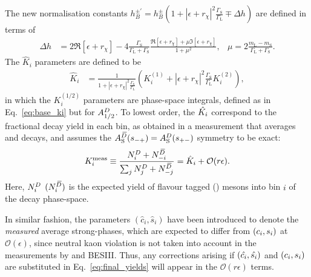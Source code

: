 The new normalisation constants $h_B^{\pm'}=h_B^{\pm}(1+|\epsilon+r_\chi|^2\frac{\Gamma_\text{S}}{\Gamma_\text{L}}\mp\Delta h)$ are defined in terms of
\begin{align}
        \Delta h &= 2\Re[\epsilon+r_\chi] 
    -4\frac{\Gamma_\text{S}}{\Gamma_\text{L}+\Gamma_\text{S}}\frac{\Re[\epsilon+r_\chi] + \mu \Im[\epsilon+r_\chi] }
    {1+\mu^2}, &
    \mu = 2 \frac{m_\text{L}-m_\text{S}}{\Gamma_\text{L}+\Gamma_\text{S}}.
\end{align}
The $\hat K_i$ parameters are defined to be
\begin{align}\label{eq:hat_Ki}
\hat K_i &= \frac{1}{1+|\epsilon+r_\chi|^2\frac{\Gamma_\text{S}}{\Gamma_\text{L}}}\left(K_i^{(1)}+|\epsilon+r_\chi|^2\frac{\Gamma_\text{S}}{\Gamma_\text{L}}K_i^{(2)}\right),
\end{align}
in which the $K^{(1/2)}_i$ parameters are phase-space integrals, defined as in Eq.~\eqref{eq:base_ki} but for $A^{D}_{1/2}$. To lowest order, the $\hat {K_i}$ correspond to the fractional \Dz decay yield in each bin, as obtained in a measurement that averages \Dz and \Dzb decays, and assumes the $A_{\rm S}^{{\kern 0.18em\overline{\kern -0.18em D}}}(s_{-+})=A_{\rm S}^{D}(s_{+-})$ symmetry to be exact:
\begin{align}\label{eq:K_meas}
  K_i^\text{meas}\equiv \frac{{N^{D}_i + N^{\kern 0.18em\overline{\kern -0.18em D}}_{-i}}}{{\sum_j N^{D}_j +N^{\kern 0.18em\overline{\kern -0.18em D}}_{-j}}} = \hat K_i + \mathcal O(r\epsilon).
 \end{align}Here, $N^{D}_i$ $(N^{\kern 0.18em\overline{\kern -0.18em D}}_i)$ is the expected yield of flavour tagged \Dz (\Dzb) mesons into bin $i$ of the \D decay phase-space. 

In similar fashion, the parameters $(\hat c_i, \hat s_i)$ have been introduced to denote the \emph{measured} average strong-phases, which are expected to differ from $(c_i,s_i)$ at $\mathcal O(\epsilon)$, since neutral kaon \CP violation is not taken into account in the measurements by \cleo and BESIII. Thus, any corrections arising if $(\hat {c_i}, \hat {s_i})$ and $(c_i, s_i)$ are substituted in Eq.~\eqref{eq:final_yields} will appear in the $\mathcal O(r\epsilon)$ terms.



